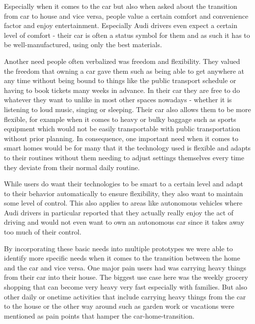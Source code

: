Especially when it comes to the car but also when asked about the transition from car to house and vice versa, people value a certain comfort and convenience factor and enjoy entertainment. Especially Audi drivers even expect a certain level of comfort - their car is often a status symbol for them and as such it has to be well-manufactured, using only the best materials. 

Another need people often verbalized was freedom and flexibility. They valued the freedom that owning a car gave them such as being able to get anywhere at any time without being bound to things like the public transport schedule or having to book tickets many weeks in advance. In their car they are free to do whatever they want to unlike in most other spaces nowadays - whether it is listening to loud music, singing or sleeping. Their car also allows them to be more flexible, for example when it comes to heavy or bulky baggage such as sports equipment which would not be easily transportable with public transportation without prior planning. In consequence, one important need when it comes to smart homes would be for many that it the technology used is flexible and adapts to their routines without them needing to adjust settings themselves every time they deviate from their normal daily routine. 

While users do want their technologies to be smart to a certain level and adapt to their behavior automatically to ensure flexibility, they also want to maintain some level of control. This also applies to areas like autonomous vehicles where Audi drivers in particular reported that they actually really enjoy the act of driving and would not even want to own an autonomous car since it takes away too much of their control. 

By incorporating these basic needs into multiple prototypes we were able to identify more specific needs when it comes to the transition between the home and the car and vice versa. One major pain users had was carrying heavy things from their car into their house. The biggest use case here was the weekly grocery shopping that can become very heavy very fast especially with families. But also other daily or onetime activities that include carrying heavy things from the car to the house or the other way around such as garden work or vacations were mentioned as pain points that hamper the car-home-transition.

